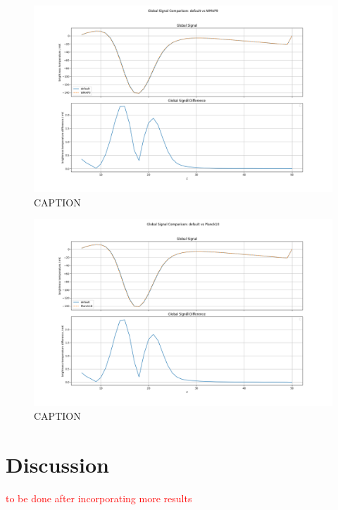 \documentclass[floats,floatfix,showpacs,amssymb,prd,superscriptaddress,nofootinbib]{revtex4-2} %
\newcommand{\red}{\textcolor{red}}
\begin{document}
\begin{figure}[H]
    \centering
    \includegraphics[width=0.9\columnwidth]{images/simulation_results/global_signal_difference_default_WMAP9.png}
    \caption{CAPTION}
    \label{fig:global_signal_difference_default_WMAP9}
\end{figure}

\begin{figure}[H]
    \centering
    \includegraphics[width=0.9\columnwidth]{images/simulation_results/global_signal_difference_default_Planck18.png}
    \caption{CAPTION}
    \label{fig:global_signal_difference_default_Planck18}
\end{figure}

\newpage
\section{Discussion}
\red{to be done after incorporating more results}
\end{document}
